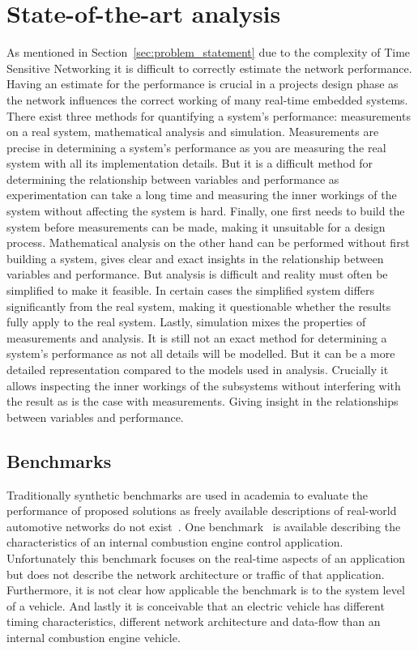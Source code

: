 \section{State-of-the-art analysis}
\label{sec:sota}
As mentioned in Section~\ref{sec:problem_statement} due to the complexity of Time Sensitive Networking it is difficult to correctly estimate the network performance. Having an estimate for the performance is crucial in a projects design phase as the network influences the correct working of many real-time embedded systems. There exist three methods for quantifying a system's performance: measurements on a real system, mathematical analysis and simulation. Measurements are precise in determining a system's performance as you are measuring the real system with all its implementation details. But it is a difficult method for determining the relationship between variables and performance as experimentation can take a long time and measuring the inner workings of the system without affecting the system is hard. Finally, one first needs to build the system before measurements can be made, making it unsuitable for a design process. Mathematical analysis on the other hand can be performed without first building a system, gives clear and exact insights in the relationship between variables and performance. But analysis is difficult and reality must often be simplified to make it feasible. In certain cases the simplified system differs significantly from the real system, making it questionable whether the results fully apply to the real system. Lastly, simulation mixes the properties of measurements and analysis. It is still not an exact method for determining a system's performance as not all details will be modelled. But it can be a more detailed representation compared to the models used in analysis. Crucially it allows inspecting the inner workings of the subsystems without interfering with the result as is the case with measurements. Giving insight in the relationships between variables and performance. 


\subsection{Benchmarks} Traditionally synthetic benchmarks are used in academia to evaluate the performance of proposed solutions as freely available descriptions of real-world automotive networks do not exist~\cite{ashjaei2021time}. One benchmark~\cite{kramer2015real} is available describing the characteristics of an internal combustion engine control application. Unfortunately this benchmark focuses on the real-time aspects of an application but does not describe the network architecture or traffic of that application. Furthermore, it is not clear how applicable the benchmark is to the system level of a vehicle. And lastly it is conceivable that an electric vehicle has different timing characteristics, different network architecture and data-flow than an internal combustion engine vehicle.

